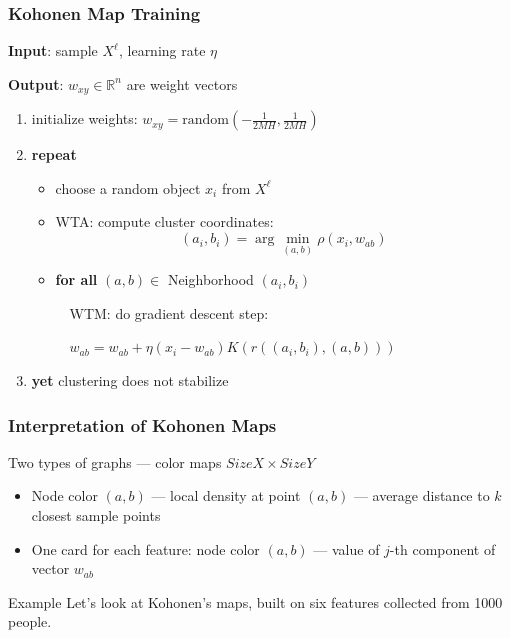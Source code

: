 \documentclass[fullscreen=true, bookmarks=true, hyperref={pdfencoding=unicode}]{beamer}
\begin{document}

\begin{frame}
  \frametitle{Kohonen Map Training}

   {\bf Input}: sample $X^\ell$, learning rate $\eta$

   {\bf Output}: $w_{xy} \in \mathbb{R}^n$ are weight vectors

   \pause
   \begin{enumerate}
     \item initialize weights: $w_{xy} = \text{random}\left(-\frac{1}{2MH}, \frac{1}{2MH} \right)$
     \pause
     \item {\bf repeat}
     \begin{itemize}
       \item choose a random object $x_i$ from $X^\ell$
       \item WTA: compute cluster coordinates: $$(a_i, b_i) = \arg\min\limits_{(a, b)} \rho(x_i, w_{ab})$$
       \item {\bf for all} $(a, b) \in $ Neighborhood $(a_i, b_i)$

        $\ \ \ $ WTM: do gradient descent step:

        $\ \ \ $ $w_{ab} = w_{ab} + \eta (x_i - w_{ab}) K(r((a_i, b_i), (a, b)))$
     \end{itemize}
     \pause
     \item {\bf yet} clustering does not stabilize
   \end{enumerate}
\end{frame}



\begin{frame}
  \frametitle{Interpretation of Kohonen Maps}

    Two types of graphs — color maps $SizeX \times SizeY$

   \begin{itemize}
     \item Node color $(a, b)$ — local density at point $(a, b)$ — average distance to $k$ closest sample points
     \item One card for each feature: node color $(a, b)$ — value of $j$-th component of vector $w_{ab}$
   \end{itemize}
   \pause
   \vspace{1cm}
   \begin{exampleblock}{Example}
   Let's look at Kohonen's maps, built on six features collected from 1000 people.
   \end{exampleblock}
\end{frame}
\end{document}
